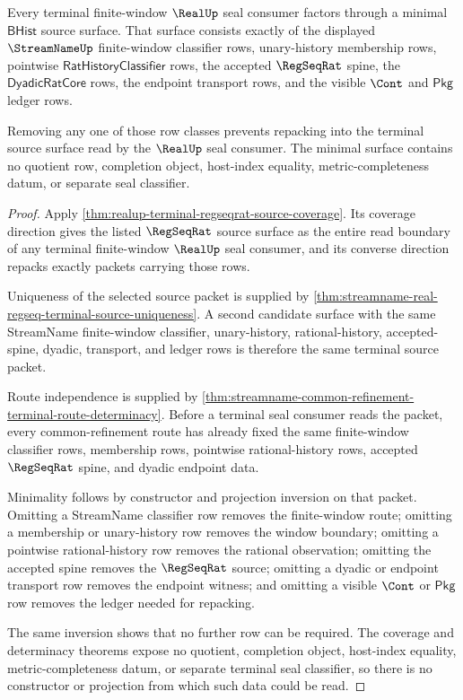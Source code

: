 \begin{theorem}
\label{thm:realup-terminal-regseqrat-source-minimality}
Every terminal finite-window $\RealUp$ seal consumer factors through a minimal
$\mathsf{BHist}$ source surface. That surface consists exactly of the displayed
$\StreamNameUp$ finite-window classifier rows, unary-history membership rows,
pointwise $\mathsf{RatHistoryClassifier}$ rows, the accepted $\RegSeqRat$
spine, the $\mathsf{DyadicRatCore}$ rows, the endpoint transport rows, and the
visible $\Cont$ and $\mathsf{Pkg}$ ledger rows.

Removing any one of those row classes prevents repacking into the terminal
source surface read by the $\RealUp$ seal consumer. The minimal surface contains
no quotient row, completion object, host-index equality,
metric-completeness datum, or separate seal classifier.
\end{theorem}
\begin{proof}
Apply \autoref{thm:realup-terminal-regseqrat-source-coverage}. Its coverage
direction gives the listed $\RegSeqRat$ source surface as the entire read
boundary of any terminal finite-window $\RealUp$ seal consumer, and its
converse direction repacks exactly packets carrying those rows.

Uniqueness of the selected source packet is supplied by
\autoref{thm:streamname-real-regseq-terminal-source-uniqueness}. A second
candidate surface with the same StreamName finite-window classifier,
unary-history, rational-history, accepted-spine, dyadic, transport, and ledger
rows is therefore the same terminal source packet.

Route independence is supplied by
\autoref{thm:streamname-common-refinement-terminal-route-determinacy}. Before a
terminal seal consumer reads the packet, every common-refinement route has
already fixed the same finite-window classifier rows, membership rows,
pointwise rational-history rows, accepted $\RegSeqRat$ spine, and dyadic
endpoint data.

Minimality follows by constructor and projection inversion on that packet.
Omitting a StreamName classifier row removes the finite-window route; omitting a
membership or unary-history row removes the window boundary; omitting a
pointwise rational-history row removes the rational observation; omitting the
accepted spine removes the $\RegSeqRat$ source; omitting a dyadic or endpoint
transport row removes the endpoint witness; and omitting a visible $\Cont$ or
$\mathsf{Pkg}$ row removes the ledger needed for repacking.

The same inversion shows that no further row can be required. The coverage and
determinacy theorems expose no quotient, completion object, host-index equality,
metric-completeness datum, or separate terminal seal classifier, so there is no
constructor or projection from which such data could be read.
\end{proof}

